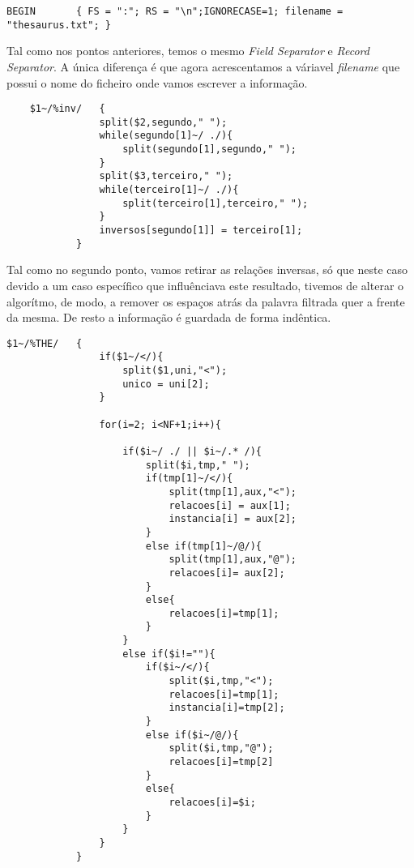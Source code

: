\documentclass{report}
\begin{document}
\bigskip

\begin{verbatim}
BEGIN       { FS = ":"; RS = "\n";IGNORECASE=1; filename = "thesaurus.txt"; }
\end{verbatim}

    Tal como nos pontos anteriores, temos o mesmo \textit{Field Separator} e \textit{Record Separator}. A única diferença é que agora acrescentamos a váriavel \textit{filename} que possui o nome do ficheiro onde vamos escrever a informação.

\begin{verbatim}
    $1~/%inv/   {
                split($2,segundo," ");
                while(segundo[1]~/ ./){
                    split(segundo[1],segundo," ");
                }
                split($3,terceiro," ");
                while(terceiro[1]~/ ./){
                    split(terceiro[1],terceiro," ");
                }
                inversos[segundo[1]] = terceiro[1]; 
            } 
\end{verbatim}
    
    Tal como no segundo ponto, vamos retirar as relações inversas, só que neste caso devido a um caso específico que influênciava este resultado, tivemos de alterar o algorítmo, de modo, a remover os espaços atrás da palavra filtrada quer a frente da mesma. De resto a informação é guardada de forma indêntica.

\begin{verbatim}
$1~/%THE/   { 
                if($1~/</){
                    split($1,uni,"<");
                    unico = uni[2];
                }

                for(i=2; i<NF+1;i++){
                    
                    if($i~/ ./ || $i~/.* /){
                        split($i,tmp," ");
                        if(tmp[1]~/</){
                            split(tmp[1],aux,"<");
                            relacoes[i] = aux[1];
                            instancia[i] = aux[2];
                        } 
                        else if(tmp[1]~/@/){
                            split(tmp[1],aux,"@");
                            relacoes[i]= aux[2];
                        }
                        else{
                            relacoes[i]=tmp[1];
                        }
                    }
                    else if($i!=""){
                        if($i~/</){
                            split($i,tmp,"<");
                            relacoes[i]=tmp[1];
                            instancia[i]=tmp[2];
                        }
                        else if($i~/@/){
                            split($i,tmp,"@");
                            relacoes[i]=tmp[2]
                        }
                        else{ 
                            relacoes[i]=$i;
                        }
                    }
                }
            }
\end{verbatim}
\end{document}
